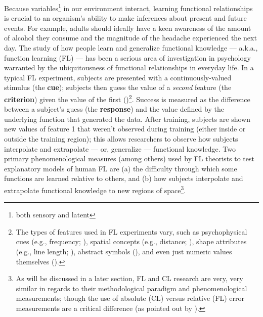 \documentclass[12pt]{article}
\let\oldcite=\cite
\renewcommand{\cite}[1]{\textcolor[rgb]{0, .121, .388}{\oldcite{#1}}}
\begin{document}
Because variables\footnote{both sensory and latent} in our environment interact, learning functional relationships is crucial to an organism's ability to make inferences about present and future events. For example, adults should ideally have a keen awareness of the amount of alcohol they consume and the magnitude of the headache experienced the next day. The study of how people learn and generalize functional knowledge --- a.k.a., function learning (FL) --- has been a serious area of investigation in psychology warranted by the ubiquitousness of functional relationships in everyday life. In a typical FL experiment, subjects are presented with a continuously-valued stimulus (the \textbf{cue}); subjects then guess the value of a \emph{second} feature (the \textbf{criterion}) given the value of the first (\cite{busemeyer1997learning})\footnote{The types of features used in FL experiments vary, such as psychophysical cues (e.g., frequency; \cite{koh1991function}), spatial concepts (e.g., distance; \cite{koh1991function}), shape attributes (e.g., line length; \cite{delosh1997extrapolation}), abstract symbols (\cite{koele1980influence}), and even just numeric values themselves (\cite{naylor1968intuitive}).}. Success is measured as the difference between a subject's guess (the \textbf{response}) and the value defined by the underlying function that generated the data. After training, subjects are shown new values of feature 1 that weren't observed during training (either inside or outside the training region); this allows researchers to observe how subjects interpolate and extrapolate --- or, generalize --- functional knowledge. Two primary phenomenological measures (among others) used by FL theorists to test explanatory models of human FL are (a) the difficulty through which some functions are learned relative to others, and (b) how subjects interpolate and extrapolate functional knowledge to new regions of space\footnote{As will be discussed in a later section, FL and CL research are very, very similar in regards to their methodological paradigm and phenomenological measurements; though the use of absolute (CL) versus relative (FL) error measurements are a critical difference (as pointed out by \cite{busemeyer1997learning}).}.
\end{document}
